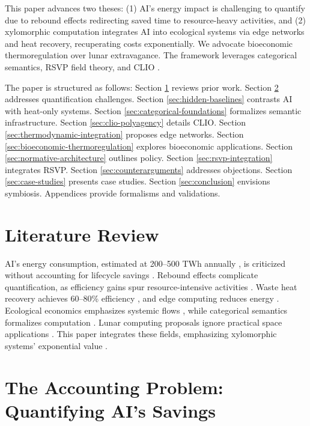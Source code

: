 \documentclass[12pt]{article}
\theoremstyle{plain}
\begin{document}
This paper advances two theses: (1) AI’s energy impact is challenging to quantify due to rebound effects redirecting saved time to resource-heavy activities, and (2) xylomorphic computation integrates AI into ecological systems via edge networks and heat recovery, recuperating costs exponentially. We advocate bioeconomic thermoregulation \citep{Yuan2024, DalyFarley2011} over lunar extravagance. The framework leverages categorical semantics, RSVP field theory, and CLIO \citep{ChengBroadbentChappell2025, Shulman2012, AbramskyCoecke2004}.

The paper is structured as follows: Section \ref{sec:literature-review} reviews prior work. Section \ref{sec:accounting-problem} addresses quantification challenges. Section \ref{sec:hidden-baselines} contrasts AI with heat-only systems. Section \ref{sec:categorical-foundations} formalizes semantic infrastructure. Section \ref{sec:clio-polyagency} details CLIO. Section \ref{sec:thermodynamic-integration} proposes edge networks. Section \ref{sec:bioeconomic-thermoregulation} explores bioeconomic applications. Section \ref{sec:normative-architecture} outlines policy. Section \ref{sec:rsvp-integration} integrates RSVP. Section \ref{sec:counterarguments} addresses objections. Section \ref{sec:case-studies} presents case studies. Section \ref{sec:conclusion} envisions symbiosis. Appendices provide formalisms and validations.

\section{Literature Review}
\label{sec:literature-review}

AI’s energy consumption, estimated at 200–500 TWh annually \citep{Koomey2011, Shehabi2016}, is criticized without accounting for lifecycle savings \citep{Strubell2019}. Rebound effects complicate quantification, as efficiency gains spur resource-intensive activities \citep{Sorrell2009, Jevons1865}. Waste heat recovery achieves 60–80\% efficiency \citep{RamboAzevedo2014}, and edge computing reduces energy \citep{Satyanarayanan2017}. Ecological economics emphasizes systemic flows \citep{DalyFarley2011, Odum1994}, while categorical semantics formalizes computation \citep{BaezStay2010, AbramskyCoecke2004}. Lunar computing proposals \citep{Shams2025} ignore practical space applications \citep{Yuan2024}. This paper integrates these fields, emphasizing xylomorphic systems’ exponential value \citep{Goodfellow2016}.

\section{The Accounting Problem: Quantifying AI’s Savings}
\label{sec:accounting-problem}
\end{document}
